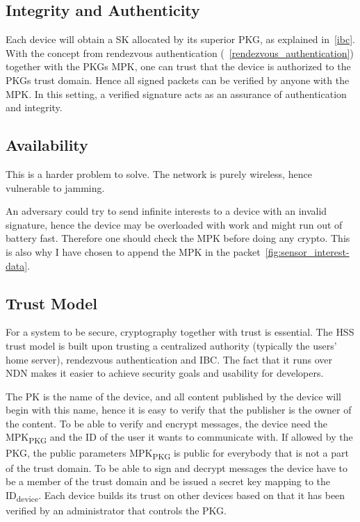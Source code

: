 \subsection{Integrity and Authenticity}
Each device will obtain a \gls{SK} allocated by its superior \gls{PKG}, as explained in~\autoref{ibc}.
With the concept from rendezvous authentication (~\autoref{rendezvous_authentication}) together with the \gls{PKG}s \gls{MPK}, one can trust that the device is authorized to the \gls{PKG}s trust domain. 
Hence all signed packets can be verified by anyone with the \gls{MPK}.
In this setting, a verified signature acts as an assurance of authentication and integrity. 


\subsection{Availability}
This is a harder problem to solve.
The network is purely wireless, hence vulnerable to jamming. 

An adversary could try to send infinite \gls{interest}s to a device with an invalid signature, hence the device may be overloaded with work and might run out of battery fast.
Therefore one should check the \gls{MPK} before doing any crypto.
This is also why I have chosen to append the MPK in the packet~\autoref{fig:sensor_interest-data}. 

\subsection{Trust Model}
For a system to be secure, cryptography together with trust is essential. 
The \gls{HSS} trust model is built upon trusting a centralized authority (typically the users' home server), rendezvous authentication and \gls{IBC}.
The fact that it runs over \gls{NDN} makes it easier to achieve security goals and usability for developers.

The \gls{PK} is the \gls{name} of the device, and all content published by the device will begin with this \gls{name}, hence it is easy to verify that the \gls{publisher} is the owner of the content.
To be able to verify and encrypt messages, the device need the MPK\textsubscript{PKG} and the ID of the user it wants to communicate with. 
If allowed by the PKG, the public parameters MPK\textsubscript{PKG} is public for everybody that is not a part of the trust domain. 
To be able to sign and decrypt messages the device have to be a member of the trust domain and be issued a secret key mapping to the ID\textsubscript{device}.
Each device builds its trust on other devices based on that it has been verified by an administrator that controls the \gls{PKG}.

